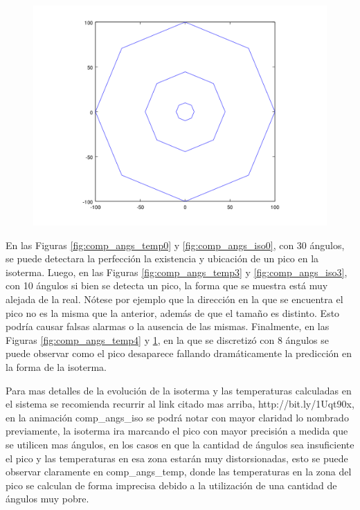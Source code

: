 \begin{figure}[H]
\begin{minipage}{0.30\textwidth}
  \centering
    \includegraphics[width=1\textwidth]{imgs/comp_angulos/comp_angs_iso4.png} 
  \caption{}
  \label{fig:comp_angs_iso4}
\end{minipage}
\end{figure}

En las Figuras \ref{fig:comp_angs_temp0} y \ref{fig:comp_angs_iso0}, con 30 ángulos, se puede detectara la perfección la existencia y ubicación de un pico en la isoterma. Luego, en las Figuras \ref{fig:comp_angs_temp3} y \ref{fig:comp_angs_iso3}, con 10 ángulos si bien se detecta un pico, la forma que se muestra está muy alejada de la real. Nótese por ejemplo que la dirección en la que se encuentra el pico no es la misma que la anterior, además de que el tamaño es distinto. Esto podría causar falsas alarmas o la ausencia de las mismas.
Finalmente, en las Figuras \ref{fig:comp_angs_temp4} y \ref{fig:comp_angs_iso4}, en la que se discretizó con 8 ángulos se puede observar como el pico desaparece fallando dramáticamente la predicción en la forma de la isoterma. 

Para mas detalles de la evolución de la isoterma y las temperaturas calculadas en el sistema se recomienda recurrir al link citado mas arriba, http://bit.ly/1Uqt90x, en la animación comp\_angs\_iso se podrá notar con mayor claridad lo nombrado previamente, la isoterma ira marcando el pico con mayor precisión a medida que se utilicen mas ángulos, en los casos en que la cantidad de ángulos sea insuficiente el pico y las temperaturas en esa zona estarán muy distorsionadas, esto se puede observar claramente en comp\_angs\_temp, donde las temperaturas en la zona del pico se calculan de forma imprecisa debido a la utilización de una cantidad de ángulos muy pobre.


